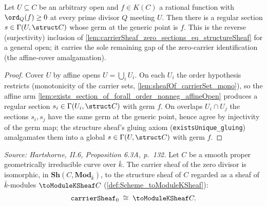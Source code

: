 \begin{lemma}
  \label{lem:exists_section_of_mem_carrierSubmoduleSheaf_zero}
  Let \(U \subseteq C\) be an arbitrary open and \(f \in K(C)\) a rational
  function with \(\ord_Q(f) \ge 0\) at every prime divisor \(Q\) meeting \(U\).
  Then there is a regular section \(s \in \Gamma(U, \struct C)\) whose germ at the
  generic point is \(f\). This is the reverse (surjectivity) inclusion of
  \cref{lem:carrierSheaf_zero_sections_eq_structureSheaf} for a general open;
  it carries the sole remaining gap of the zero-carrier identification (the
  affine-cover amalgamation).
\end{lemma}
\begin{proof}
        \leanok
  Cover \(U\) by affine opens \(U = \bigcup_i U_i\). On each \(U_i\) the order
  hypothesis restricts (monotonicity of the carrier sets,
  \cref{lem:sheafOf_carrierSet_mono}), so the affine arm
  \cref{lem:exists_section_of_forall_order_nonneg_affineOpen} produces a regular
  section \(s_i \in \Gamma(U_i, \struct C)\) with germ \(f\). On overlaps
  \(U_i \cap U_j\) the sections \(s_i, s_j\) have the same germ at the generic
  point, hence agree by injectivity of the germ map; the structure sheaf's gluing
  axiom (\texttt{existsUnique\_gluing}) amalgamates them into a global
  \(s \in \Gamma(U, \struct C)\) with germ \(f\).
\end{proof}

\begin{lemma}
  \label{lem:carrierSheaf_zero_iso_toModuleKSheaf}
  \textit{Source: Hartshorne, II.6, Proposition 6.3A, p.~132.}
  Let \(C\) be a smooth proper geometrically irreducible curve over \(\bar k\).
  The carrier sheaf of the zero divisor is isomorphic, in
  \(\mathbf{Sh}(C, \mathbf{Mod}_{\bar k})\), to the structure sheaf of \(C\)
  regarded as a sheaf of \(\bar k\)-modules \(\toModuleKSheaf C\)
  (\cref{def:Scheme_toModuleKSheaf}):
  \[
    \texttt{carrierSheaf}_0 \;\cong\; \toModuleKSheaf C.
  \]
\end{lemma}

